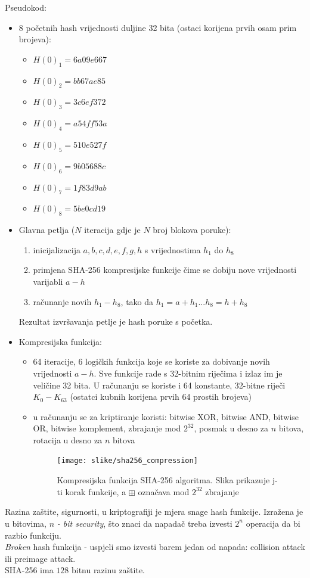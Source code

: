 \documentclass[12pt]{article}
\begin{document}
Pseudokod:
\begin{itemize}
	\item 8 početnih hash vrijednosti duljine 32 bita (ostaci korijena prvih osam prim brojeva):
	\begin{itemize}
		\item $H(0)_1 = 6a09e667$
		\item $H(0)_2 = bb67ae85$
		\item $H(0)_3 = 3c6ef372$
		\item $H(0)_4 = a54ff53a$
		\item $H(0)_5 = 510e527f$
		\item $H(0)_6 = 9b05688c$
		\item $H(0)_7 = 1f83d9ab$
		\item $H(0)_8 = 5be0cd19$
	\end{itemize}
	\item Glavna petlja ($N$ iteracija gdje je $N$ broj blokova poruke):
	\begin{enumerate}
		\item inicijalizacija $a, b, c, d, e, f, g, h$ s vrijednostima $h_1$ do $h_8$
		\item primjena SHA-256 kompresijske funkcije čime se dobiju nove vrijednosti varijabli $a - h$
		\item računanje novih $h_1 - h_8$, tako da $h_1 = a + h_1 . . . h_8 = h + h_8$
	\end{enumerate}
	Rezultat izvršavanja petlje je hash poruke s početka.
	\item Kompresijska funkcija:
	\begin{itemize}
		\item 64 iteracije, 6 logičkih funkcija koje se koriste za dobivanje novih vrijednosti $a - h$. Sve funkcije rade s 32-bitnim riječima i izlaz im je veličine 32 bita. U računanju se koriste i 64 konstante, 32-bitne riječi $K_0-K_{63}$ (ostatci kubnih korijena prvih 64 prostih brojeva)
		\item u računanju se za kriptiranje koristi: bitwise XOR, bitwise AND, bitwise OR, bitwise komplement, zbrajanje mod $2^{32}$, posmak u desno za $n$ bitova, rotacija u desno za $n$ bitova\cite{sha-description}
		\begin{figure}[h!]
			\centering
			\texttt{[image: slike/sha256\_compression]}
			\caption{Kompresijska funkcija SHA-256 algoritma. Slika prikazuje j-ti korak funkcije, a $\boxplus$ označava mod $2^{32}$ zbrajanje}
		\end{figure}
	\end{itemize}
\end{itemize}
Razina zaštite, sigurnosti, u kriptografiji je mjera snage hash funkcije. Izražena je u bitovima, $n$ \textit{- bit security}, što znaci da napadač treba izvesti $2^n$ operacija da bi razbio funkciju.\\ \textit{Broken} hash funkcija - uspjeli smo izvesti barem jedan od napada: collision attack ili preimage attack. \\ 
SHA-256 ima $128$ bitnu razinu zaštite.
\end{document}
